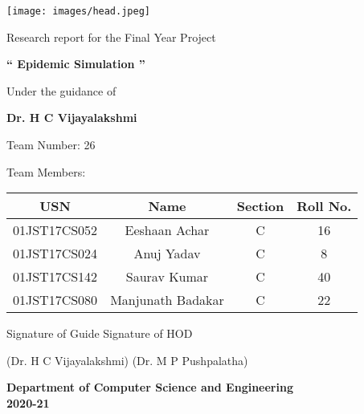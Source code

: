\documentclass[12pt, a4paper]{extarticle}
\begin{document}
    
    \begin{titlepage}
		\thisfancypage{\setlength{\fboxsep}{1pt}\doublebox}{}		
		\begin{center}
    		\texttt{[image: images/head.jpeg]}    		
    		
    		\vspace{0.5in}
			Research report for the Final Year Project
			
			\vspace{0.125in}
			{\Large \textbf{`` Epidemic Simulation ''}}
			
			\vspace{1in}
			Under the guidance of
			
			\vspace{0.125in}
			\textbf{Dr. H C Vijayalakshmi}
		\end{center}			
		\vspace{0.5in}
		
		\hspace{0.25in}Team Number: 26
		
		\hspace{0.25in}Team Members:	
		\vspace{0.125in}
        \begin{table}[h!]
            \begin{center}
                \begin{tabular}{|c|c|c|c|} \hline
                	\textbf{USN} & \textbf{Name} & \textbf{Section} & \textbf{Roll No.} \\ \hline
    	            01JST17CS052 & Eeshaan Achar & C & 16\\ \hline
	                01JST17CS024 & Anuj Yadav & C & 8\\ \hline
            	    01JST17CS142 & Saurav Kumar & C & 40\\ \hline
        	        01JST17CS080 & Manjunath Badakar & C & 22\\ \hline
                \end{tabular}
            \end{center}
		\end{table}
		
        \vspace{1.5in}
		\hspace{0.25in}Signature of Guide \hspace{2.3in} Signature of HOD
		
		\hspace{0.1in}(Dr. H C Vijayalakshmi) \hspace{1.9in} (Dr. M P Pushpalatha)		
		
		\vspace{0.25in}
		\begin{center}       
            \textbf{Department of Computer Science and Engineering\\2020-21}	
		\end{center}
	\end{titlepage}
    
\end{document}
